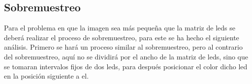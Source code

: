 \documentclass{article}
\begin{document}
\subsection{Sobremuestreo}
Para el problema en que la imagen sea más pequeña que la matriz de leds se deberá realizar el proceso de sobremuestreo, para este se ha hecho el siguiente análisis.
Primero se hará un proceso similar al sobremuestreo, pero al contrario del sobremuestreo, aquí no se dividirá por el ancho de la matriz de leds, sino que se tomaran intervalos fijos de dos leds, para después posicionar el color dicho led en la posición siguiente a el.
\end{document}
